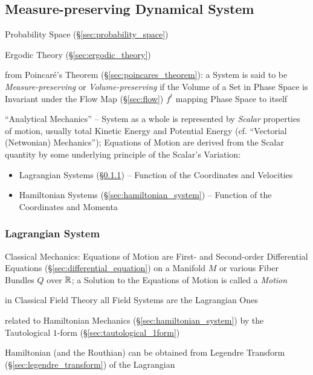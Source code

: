 \subsection{Measure-preserving Dynamical System}
\label{sec:measure_preserving_system}

Probability Space (\S\ref{sec:probability_space})

\fist Ergodic Theory (\S\ref{sec:ergodic_theory})

from Poincar\'e's Theorem (\S\ref{sec:poincares_theorem}): a System is said to
be \emph{Measure-preserving} or \emph{Volume-preserving} if the Volume of a Set
in Phase Space is Invariant under the Flow Map (\S\ref{sec:flow}) $f^t$ mapping
Phase Space to itself

``Analytical Mechanics'' -- System as a whole is represented by \emph{Scalar}
properties of motion, usually total Kinetic Energy and Potential Energy (cf.
``Vectorial (Netwonian) Mechanics''); Equations of Motion are derived from the
Scalar quantity by some underlying principle of the Scalar's Variation:
\begin{itemize}
  \item Lagrangian Systems (\S\ref{sec:lagrangian_system}) -- Function of the
    Coordinates and Velocities
  \item Hamiltonian Systems (\S\ref{sec:hamiltonian_system}) -- Function of the
    Coordinates and Momenta
\end{itemize}



\subsubsection{Lagrangian System}\label{sec:lagrangian_system}

Classical Mechanics: Equations of Motion are First- and Second-order
Differential Equations (\S\ref{sec:differential_equation}) on a Manifold $M$ or
various Fiber Bundles $Q$ over $\mathbb{R}$; a Solution to the Equations of Motion
is called a \emph{Motion}

in Classical Field Theory all Field Systems are the Lagrangian Ones

related to Hamiltonian Mechanics (\S\ref{sec:hamiltonian_system}) by the
Tautological $1$-form (\S\ref{sec:tautological_1form})

Hamiltonian (and the Routhian) can be obtained from Legendre Transform
(\S\ref{sec:legendre_transform}) of the Lagrangian

